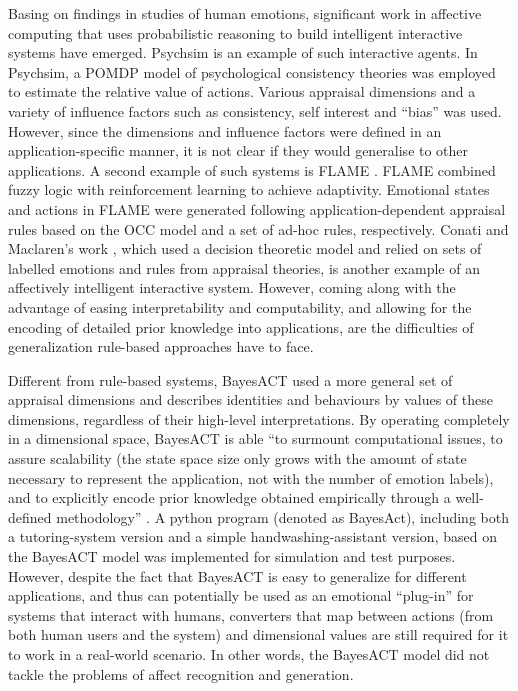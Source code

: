 Basing on findings in studies of human emotions, significant work in affective computing that uses probabilistic reasoning to build intelligent interactive systems have emerged. Psychsim \cite{pynadath2005psychsim} is an example of such interactive agents. In Psychsim, a POMDP model of psychological consistency theories was employed to estimate the relative value of actions. Various appraisal dimensions and a variety of influence factors such as consistency, self interest and ``bias'' was used. However, since the dimensions and influence factors were defined in an application-specific manner, it is not clear if they would generalise to other applications. A second example of such systems is FLAME \cite{el2000flame}. FLAME combined fuzzy logic with reinforcement learning to achieve adaptivity. Emotional states and actions in FLAME were generated following application-dependent appraisal rules based on the OCC model \cite{ortony1990cognitive} and a set of ad-hoc rules, respectively. Conati and Maclaren's work \cite{conati2009empirically}, which used a decision theoretic model and relied on sets of labelled emotions and rules from appraisal theories, is another example of an affectively intelligent interactive system. However, coming along with the advantage of easing interpretability and computability, and allowing for the encoding of detailed prior knowledge into applications, are the difficulties of generalization rule-based approaches have to face.

Different from rule-based systems, BayesACT \cite{hoey2013bayesian} used a more general set of appraisal dimensions and describes identities and behaviours by values of these dimensions, regardless of their high-level interpretations. By operating completely in a dimensional space, BayesACT is able ``to surmount computational issues, to assure scalability (the state space size only grows with the amount of state necessary to represent the application, not with the number of emotion labels), and to explicitly encode prior knowledge obtained empirically through a well-defined methodology'' \cite{hoey2013bayesian}. A python program (denoted as BayesAct), including both a tutoring-system version and a simple handwashing-assistant version, based on the BayesACT model was implemented for simulation and test purposes. However, despite the fact that BayesACT is easy to generalize for different applications, and thus can potentially be used as an emotional ``plug-in'' for systems that interact with humans, converters that map between actions (from both human users and the system) and dimensional values are still required for it to work in a real-world scenario. In other words, the BayesACT model did not tackle the problems of affect recognition and generation.

